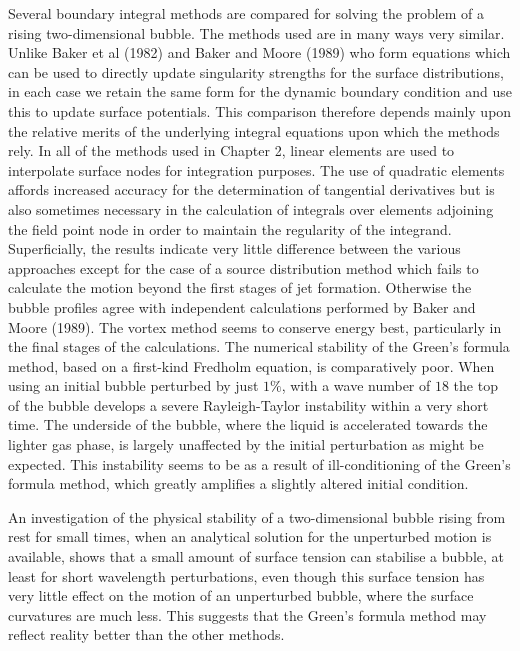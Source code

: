 Several boundary integral methods are compared for
solving the problem of a rising two-dimensional bubble.
The methods used are in many ways very similar. Unlike Baker et al (1982) and
Baker and Moore (1989) who form equations which can be used to directly update 
singularity strengths for the surface distributions, in each case we retain
the same form for the dynamic boundary condition and use this to update surface 
potentials. This comparison therefore depends mainly upon the relative merits
of the underlying integral equations upon which the methods rely.
In all of the methods used in Chapter 2,
linear elements are used to interpolate surface nodes for integration
purposes. The use of quadratic elements affords increased accuracy
for the determination of tangential derivatives but is also sometimes necessary
in the calculation of integrals over elements adjoining
the field point node in order to maintain the regularity of the integrand.
Superficially, the results indicate very little difference between the various 
approaches except for the case of a source distribution method which fails
to calculate the motion beyond the first stages of jet formation. Otherwise the
bubble profiles agree with independent calculations performed by Baker and 
Moore (1989). 
The vortex method seems to conserve energy best, particularly in the final
stages 
of the calculations. The numerical stability of the Green's formula method,
based on a first-kind Fredholm equation, is comparatively
poor. When using an initial bubble perturbed by just $1\%$, with a wave number of
$18$ the top of the bubble develops a severe
Rayleigh-Taylor instability within a very 
short time. The underside of the bubble, where the liquid is accelerated
towards the lighter gas phase, is largely unaffected by the initial 
perturbation as might be expected.
This instability seems to be as a result of ill-conditioning of the Green's
formula method, which greatly amplifies a slightly altered initial condition.

An investigation of the physical stability of a two-dimensional bubble
rising from rest for small times, when an analytical solution for the 
unperturbed motion is available, shows that a small amount of surface tension
can stabilise a bubble, at least for short wavelength perturbations, 
even though this surface tension has very little
effect on the motion of an unperturbed bubble, where the 
surface curvatures are much less. This suggests that the Green's formula
method may reflect reality better than the other methods.

